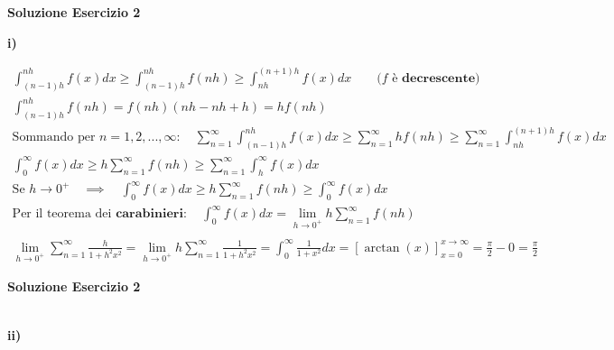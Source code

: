 \documentclass[11pt,reqno]{amsart}
\begin{document}
\centerline{\bf Soluzione Esercizio 2 }
{\bf i)}

\begin{gather*}
 \int_{(n-1)h}^{nh} f(x)dx \geq \int_{(n-1)h}^{nh} f(nh) \geq \int_{nh}^{(n+1)h} f(x)dx \quad \quad \text{(} f \text{ è } \textbf{decrescente} \text{)}\\
 \int_{(n-1)h}^{nh} f(nh) = f(nh) (nh - nh + h) = hf(nh)\\
 \text{Sommando per } n = 1,2,...,\infty: \quad \sum_{n = 1}^{\infty} \int_{(n-1)h}^{nh} f(x)dx \geq \sum_{n = 1}^{\infty} hf(nh) \geq \sum_{n = 1}^{\infty} \int_{nh}^{(n+1)h} f(x)dx\\
 \int_{0}^{\infty} f(x)dx \geq h \sum_{n = 1}^{\infty} f(nh) \geq \sum_{n = 1}^{\infty} \int_{h}^{\infty} f(x)dx\\
 \text{Se } h \to 0^{+} \quad \implies \quad \int_{0}^{\infty} f(x)dx \geq h \sum_{n = 1}^{\infty} f(nh) \geq \int_{0}^{\infty} f(x)dx\\
 \text{Per il teorema dei } \textbf{carabinieri}: \quad \int_{0}^{\infty} f(x)dx = \lim_{h \to 0^{+}} h \sum_{n = 1}^{\infty} f(nh)\\\\
 \lim_{h \to 0^{+}} \sum_{n = 1}^{\infty} \frac{h}{1 + h^2x^2} = \lim_{h \to 0^{+}} h \sum_{n = 1}^{\infty} \frac{1}{1 + h^2x^2} = \int_{0}^{\infty} \frac{1}{1 + x^2}dx = [\arctan(x)]_{x=0}^{x \to \infty} = \frac{\pi}{2} - 0 = \frac{\pi}{2}
\end{gather*}

\newpage

\centerline{\bf Soluzione Esercizio 2 }
\begin{gather*}
\end{gather*}

{\bf ii)}
\iffalse
\begin{gather*}
 \lim_{n \to \infty} \frac{1}{n} \int_{0}^{n} xf(x) dx = \lim_{n \to \infty} \frac{\displaystyle\int_{0}^{n} xf(x) dx}{n} = \lim_{n \to \infty} \frac{\displaystyle\int_{0}^{1} xf(x) dx \,\, + \ldots + \int_{n-1}^{n} xf(x) dx}{n}\\
 i_n := \int_{n-1}^{n} xf(x) dx\\
 \text{Se } \exists \, \lim_{n \to \infty} i_n \quad \stackrel{\mathclap{\tiny\mbox{Cesàro}}}{\implies} \quad \lim_{n \to \infty} i_n = \lim_{n \to \infty} \frac{1}{n} \int_{0}^{n} xf(x) dx\\\\
 \lim_{n \to \infty} i_n = \lim_{n \to \infty} \int_{n-1}^{n} xf(x) dx = \frac{1}{n-n+1} \int_{n-1}^{n} xf(x) dx = \theta f(\theta) \quad \text{per qualche } \theta \in (n-1,n)\\\\
 \text{Siccome } \theta \in (n-1,n) \quad n \to \infty \quad \implies \quad \theta \to \infty\\
 \lim_{\theta \to \infty} \theta f(\theta) = 0 \quad \text{(punto } \textbf{(2.2)} \text{ in appendice)}\\\\
 \implies \lim_{n \to \infty} \frac{1}{n} \int_{0}^{n} xf(x) dx = 0
\end{gather*}
\fi
\end{document}
